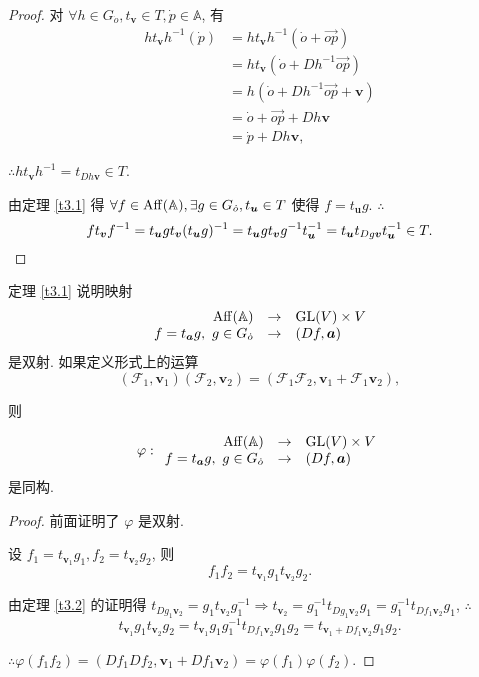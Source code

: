 \documentclass[color=black,device=normal,lang=cn,mode=geye]{elegantnote}
\begin{document}
\begin{proof}
    对 $\forall h\in G_{\dot{o}},t_{\boldsymbol{v}}\in T,\dot{p}\in\mathbb{A}$, 有
    \begin{align*}
        ht_{\boldsymbol{v}}h^{-1}(\dot{p}) & =ht_{\boldsymbol{v}}h^{-1}(\dot{o}+\overrightarrow{op}) \\
        & =ht_{\boldsymbol{v}}(\dot{o}+Dh^{-1}\overrightarrow{op}) \\
        & =h(\dot{o}+Dh^{-1}\overrightarrow{op}+\boldsymbol{v}) \\
        & =\dot{o}+\overrightarrow{op}+Dh\boldsymbol{v} \\
        & =\dot{p}+Dh\boldsymbol{v},
    \end{align*}

    $\therefore ht_{\boldsymbol{v}}h^{-1}=t_{Dh\boldsymbol{v}}\in T$.

    由定理 \ref{t3.1} 得 $\forall f\in\operatorname{Aff} (\mathbb{A}),\exists g\in G_{\dot{o}},t_{\boldsymbol{u}}\in T$ 使得 $f=t_{\boldsymbol{u}}g$. $\therefore$
    \[ft_{\boldsymbol{v}}f^{-1}=t_{\boldsymbol{u}}gt_{\boldsymbol{v}}(t_{\boldsymbol{u}}g)^{-1}=t_{\boldsymbol{u}}gt_{\boldsymbol{v}}g^{-1}t_{\boldsymbol{u}}^{-1}=t_{\boldsymbol{u}}t_{Dg\boldsymbol{v}}t_{\boldsymbol{u}}^{-1}\in T.\qedhere\]
\end{proof}
定理 \ref{t3.1} 说明映射
\[\begin{array}{rcl}
    \operatorname{Aff} (\mathbb{A}) & \to & \operatorname{GL} (V)\times V \\
    f=t_{\boldsymbol{a}}g,\ g\in G_{\dot{o}} & \to & (Df,\boldsymbol{a}) \\
\end{array}\]
是双射. 如果定义形式上的运算
\[(\mathcal{F}_1,\boldsymbol{v}_1)(\mathcal{F}_2,\boldsymbol{v}_2)=(\mathcal{F}_1\mathcal{F}_2,\boldsymbol{v}_1+\mathcal{F}_1\boldsymbol{v}_2),\]

则
\begin{theorem}\label{t3.3}
    \[\varphi:\begin{array}{rcl}
        \operatorname{Aff} (\mathbb{A}) & \to & \operatorname{GL} (V)\times V \\
        f=t_{\boldsymbol{a}}g,\ g\in G_{\dot{o}} & \to & (Df,\boldsymbol{a}) \\
    \end{array}\]
    是同构.
\end{theorem}
\begin{proof}
    前面证明了 $\varphi$ 是双射.

    设 $f_1=t_{\boldsymbol{v}_1}g_1,f_2=t_{\boldsymbol{v}_2}g_2$, 则
    \[f_1f_2=t_{\boldsymbol{v}_1}g_1t_{\boldsymbol{v}_2}g_2.\]

    由定理 \ref{t3.2} 的证明得 $t_{Dg_1\boldsymbol{v}_2}=g_1t_{\boldsymbol{v}_2}g_1^{-1}\Rightarrow t_{\boldsymbol{v}_2}=g_1^{-1}t_{Dg_1\boldsymbol{v}_2}g_1=g_1^{-1}t_{Df_1\boldsymbol{v}_2}g_1$, $\therefore$
    \[t_{\boldsymbol{v}_1}g_1t_{\boldsymbol{v}_2}g_2=t_{\boldsymbol{v}_1}g_1g_1^{-1}t_{Df_1\boldsymbol{v}_2}g_1g_2=t_{\boldsymbol{v}_1+Df_1\boldsymbol{v}_2}g_1g_2.\]

    $\therefore\varphi(f_1f_2)=(Df_1Df_2,\boldsymbol{v}_1+Df_1\boldsymbol{v}_2)=\varphi(f_1)\varphi(f_2)$.
\end{proof}
\end{document}
